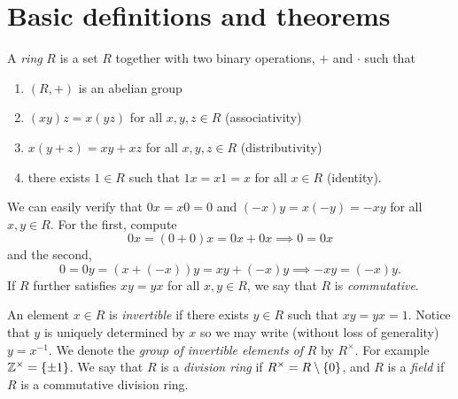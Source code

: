 \section{Basic definitions and theorems}

\begin{dfn}
  A \emph{ring} $R$ is a set $R$ together with two binary operations, $+$ and $\cdot$ such that
  \begin{enumerate}
  \item $(R, +)$ is an abelian group
  \item $(xy)z = x(yz)$ for all $x,y,z \in R$ (associativity)
  \item $x(y+z) = xy + xz$ for all $x,y,z \in R$ (distributivity)
  \item there exists $1 \in R$ such that $1 x = x 1 = x$ for all $x \in R$ (identity).
  \end{enumerate}
\end{dfn}

We can easily verify that $0 x = x 0 = 0$ and $(-x)y = x (-y) = - xy$ for all $x, y \in R$. For the first, compute
\[
0 x = (0 + 0)x = 0 x + 0 x \implies 0 = 0 x
\]
and the second,
\[
0 = 0 y = (x + (-x))y = x y + (-x)y \implies - x y = (-x) y.
\]
If $R$ further satisfies $xy = yx$ for all $x,y \in R$, we say that $R$ is \emph{commutative}. 

An element $x \in R$ is \emph{invertible} if there exists $y \in R$ such that $xy = y x = 1$. Notice that $y$ is uniquely determined by $x$ so we may write (without loss of generality) $y = x^{-1}$. We denote the \emph{group of invertible elements of} $R$ by $R^\times$. For example $\mathbb{Z}^\times = \left\{\pm 1\right\}$. We say that $R$ is a \emph{division ring} if $R^\times = R \setminus \left\{0\right\}$, and $R$ is a \emph{field} if $R$ is a commutative division ring. 

